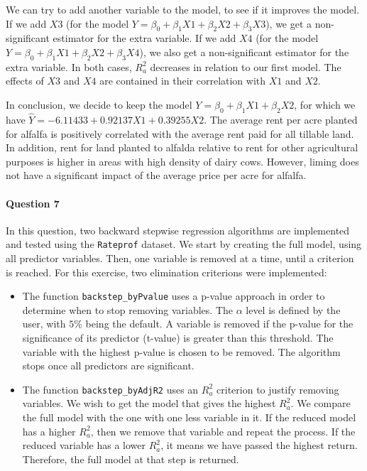 \documentclass[]{article}
\let\oldparagraph\paragraph
\renewcommand{\paragraph}[1]{\oldparagraph{#1}\mbox{}}
\begin{document}
We can try to add another variable to the model, to see if it improves the model. If we add $X3$ (for the model $Y = \beta_0 + \beta_1 X1 + \beta_2 X2 + \beta_3 X3$), we get a non-significant estimator for the extra variable. If we add $X4$ (for the model $Y = \beta_0 + \beta_1 X1 + \beta_2 X2 + \beta_3 X4$), we also get a non-significant estimator for the extra variable. In both cases, $R^2_a$ decreases in relation to our first model. The effects of $X3$ and $X4$ are contained in their correlation with $X1$ and $X2$.

In conclusion, we decide to keep the model $Y = \beta_0 + \beta_1 X1 + \beta_2 X2$, for which we have $\hat{Y} = -6.11433 + 0.92137 X1 + 0.39255 X2$. The average rent per acre planted for alfalfa is positively correlated with the average rent paid for all tillable land. In addition, rent for land planted to alfalda relative to rent for other agricultural purposes is higher in areas with high density of dairy cows. However, liming does not have a significant impact of the average price per acre for alfalfa.

\paragraph{\Large Question 7}\normalsize

In this question, two backward stepwise regression algorithms are implemented and tested using the \texttt{Rateprof} dataset. We start by creating the full model, using all predictor variables. Then, one variable is removed at a time, until a criterion is reached. For this exercise, two elimination criterions were implemented:

\begin{itemize}
\item The function \texttt{backstep\_byPvalue} uses a p-value approach in order to determine when to stop removing variables. The $\alpha$ level is defined by the user, with $5\%$ being the default. A variable is removed if the p-value for the significance of its predictor (t-value) is greater than this threshold. The variable with the highest p-value is chosen to be removed. The algorithm stops once all predictors are significant.

\item The function \texttt{backstep\_byAdjR2} uses an $R^2_a$ criterion to justify removing variables. We wish to get the model that gives the highest $R^2_a$. We compare the full model with the one with one less variable in it. If the reduced model has a higher $R^2_a$, then we remove that variable and repeat the process. If the reduced variable has a lower $R^2_a$, it means we have passed the highest return. Therefore, the full model at that step is returned. 
\end{itemize}
\end{document}
